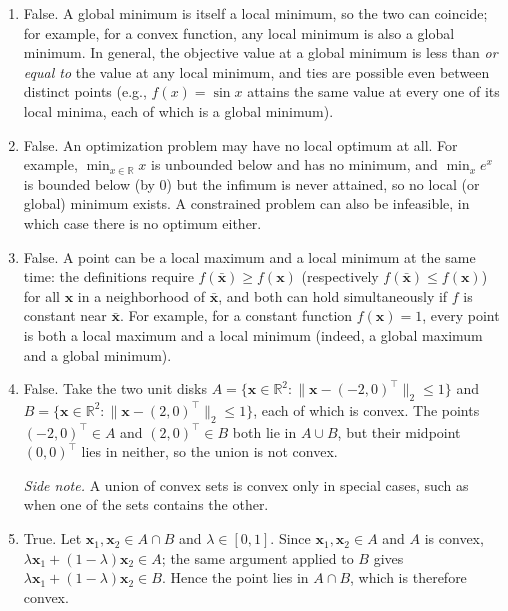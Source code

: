 \begin{solution}
\begin{enumerate}[label=(\alph*)]
        \emph{Side note.} The two formulations are not equally convenient numerically, however: $\|\mathbf{F}(\mathbf{x})\|_2 = \sqrt{\sum_{i=1}^M F_i(\mathbf{x})^2}$ is not differentiable at points where $\mathbf{F}(\mathbf{x}) = \mathbf{0}$, which is exactly where the solution of a well-fit problem lies, whereas the squared objective is smooth with gradient $2 \nabla \mathbf{F}(\mathbf{x})^\top \mathbf{F}(\mathbf{x})$. This is why least-squares problems are always posed with the square.
        \item  False. A global minimum is itself a local minimum, so the two can coincide; for example, for a convex function, any local minimum is also a global minimum. In general, the objective value at a global minimum is less than \emph{or equal to} the value at any local minimum, and ties are possible even between distinct points (e.g., $f(x) = \sin x$ attains the same value at every one of its local minima, each of which is a global minimum).
        \item  False. An optimization problem may have no local optimum at all. For example, $\min_{x \in \mathbb{R}} x$ is unbounded below and has no minimum, and $\min_{x} e^{x}$ is bounded below (by 0) but the infimum is never attained, so no local (or global) minimum exists. A constrained problem can also be infeasible, in which case there is no optimum either.
        \item  False. A point can be a local maximum and a local minimum at the same time: the definitions require $f(\bar{\mathbf{x}}) \ge f(\mathbf{x})$ (respectively $f(\bar{\mathbf{x}}) \le f(\mathbf{x})$) for all $\mathbf{x}$ in a neighborhood of $\bar{\mathbf{x}}$, and both can hold simultaneously if $f$ is constant near $\bar{\mathbf{x}}$. For example, for a constant function $f(\mathbf{x}) = 1$, every point is both a local maximum and a local minimum (indeed, a global maximum and a global minimum).
        \item  False. Take the two unit disks $A = \{\mathbf{x} \in \mathbb{R}^2 : \|\mathbf{x} - (-2,0)^\top\|_2 \le 1\}$ and $B = \{\mathbf{x} \in \mathbb{R}^2 : \|\mathbf{x} - (2,0)^\top\|_2 \le 1\}$, each of which is convex. The points $(-2,0)^\top \in A$ and $(2,0)^\top \in B$ both lie in $A \cup B$, but their midpoint $(0,0)^\top$ lies in neither, so the union is not convex.

        \emph{Side note.} A union of convex sets is convex only in special cases, such as when one of the sets contains the other.
        \item  True. Let $\mathbf{x}_1, \mathbf{x}_2 \in A \cap B$ and $\lambda \in [0,1]$. Since $\mathbf{x}_1, \mathbf{x}_2 \in A$ and $A$ is convex, $\lambda \mathbf{x}_1 + (1-\lambda)\mathbf{x}_2 \in A$; the same argument applied to $B$ gives $\lambda \mathbf{x}_1 + (1-\lambda)\mathbf{x}_2 \in B$. Hence the point lies in $A \cap B$, which is therefore convex.


\end{enumerate}
\end{solution}
